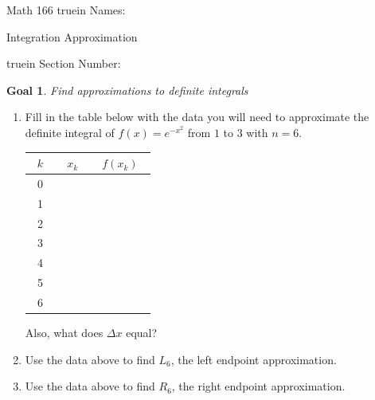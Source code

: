 \documentclass[12pt]{article}
\newtheorem*{goal}{Goal}
\begin{document}
\pagestyle{empty} %

\noindent
{Math 166    truein  Names:\ \hrulefill}

\noindent
{Integration Approximation}

\noindent  {} truein  Section Number:\ \hrulefill
\medskip

\begin{goal} \rm
Find approximations to definite integrals
\end{goal}

\begin{enumerate}




\item Fill in the table below with the data you will need to approximate the definite integral of $f(x)=e^{-x^2}$ from $1$ to $3$ with $n=6$.

\begin{tabular}{|c|r|r|}
\hline  
~$k$~ & ~$x_k$~ & ~$f(x_k)$~ \\
\hline
0 & & ~~~ \\
\hline
1 & & \\
\hline
2 & & \\
\hline
3 & & \\
\hline
4 & & \\
\hline
5 & & \\
\hline
6 & & \\
\hline
\end{tabular}
\hspace{1.5in}
Also, what does $\Delta x$ equal? 

\item Use the data above to find $L_6$, the left endpoint approximation.

\bigskip

\bigskip

\item Use the data above to find $R_6$, the right endpoint approximation.


\end{enumerate}
\end{document}
